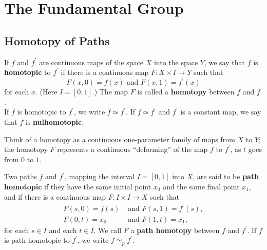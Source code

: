 \newpage
\setcounter{section}{8}

\section{The Fundamental Group}

\setcounter{subsection}{50}

\subsection{Homotopy of Paths}

\begin{definition}[Homotopy]
If $f$ and $f^{\prime}$ are continuous maps of the space $X$ into the space $Y$, we say that $f$ is \textbf{homotopic} to $f^{\prime}$
if there is a continuous map $F\colon X \times I \rightarrow Y$ such that
\[
    F(x, 0) = f(x) \text{ and } F(x, 1) = f^{\prime}(x)
\]
for each $x$. (Here $I = [0, 1]$.) The map $F$ is called a \textbf{homotopy} between $f$ and $f^{\prime}$. \\

If $f$ is homotopic to $f^{\prime}$, we write $f \simeq f^{\prime}$. If $f \simeq f^{\prime}$ and $f^{\prime}$ is a constant map, we say that
$f$ is \textbf{nulhomotopic}.
\end{definition}

\begin{remark}
Think of a homotopy as a continuous one-parameter family of maps from $X$ to $Y$; the homotopy $F$ represents a continuous ``deforming'' of the map $f$ to $f^{\prime}$, 
as $t$ goes from $0$ to $1$.
\end{remark}

\begin{definition}
Two paths $f$ and $f^{\prime}$, mapping the interval $I = [0, 1]$ into $X$, are said to be \textbf{path homotopic} if they have the same initial point
$x_0$ and the same final point $x_1$, and if there is a continuous map $F\colon I \times I \rightarrow X$ such that
\begin{align*}
    F(s, 0) = f(s) &\text{ and } F(s, 1) = f^{\prime}(s), \\
    F(0, t) = x_0 &\text{ and } F(1, t) = x_1,
\end{align*}
for each $s \in I$ and each $t \in I$. We call $F$ a \textbf{path homotopy} between $f$ and $f^{\prime}$. If $f$ is path homotopic to $f^{\prime}$, we write $f \simeq_p f^{\prime}$.
\end{definition}

